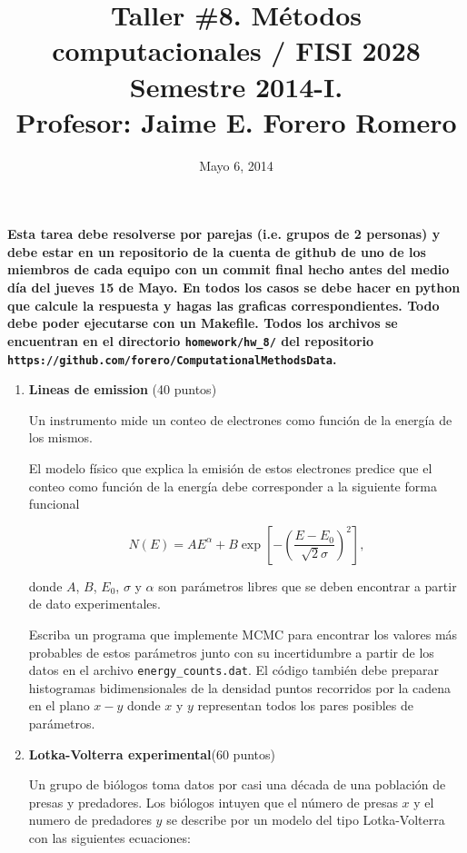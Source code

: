 \documentclass{article}
\title{Taller \#8. M\'etodos computacionales / FISI 2028 \\Semestre
  2014-I. \\ Profesor: Jaime E. Forero Romero}
\date{Mayo 6, 2014}
\begin{document}
\maketitle

{\bf Esta tarea debe resolverse por parejas (i.e. grupos de 2
  personas) y debe estar en un repositorio de la cuenta de github de
  uno de los miembros de cada equipo con un commit final hecho antes del
  medio d\'ia del jueves 15 de Mayo.  En todos los casos se debe hacer
  en python que calcule la respuesta y hagas las graficas
  correspondientes. Todo debe poder ejecutarse con un Makefile. Todos
  los archivos se encuentran en el directorio \verb"homework/hw_8/" del
  repositorio \verb"https://github.com/forero/ComputationalMethodsData".}  


\begin{enumerate}

\item {\bf Lineas de emission} (40 puntos)


Un instrumento mide un conteo de electrones como funci\'on de la
energ\'ia de los mismos.

El modelo f\'isico que explica la emisi\'on de estos electrones
predice que el conteo como funci\'on de la energ\'ia debe corresponder
a la siguiente forma funcional

\begin{equation}
N(E) = AE^{\alpha} + B\exp\left[-\left(\frac{E-E_0}{\sqrt{2}\sigma}\right)^2\right], 
\end{equation}

donde $A$, $B$, $E_0$, $\sigma$ y $\alpha$  son par\'ametros libres
que se deben encontrar a partir de dato experimentales.

Escriba un programa que implemente MCMC para encontrar los valores
m\'as probables de estos par\'ametros junto con su incertidumbre a
partir de los datos en el archivo \verb"energy_counts.dat". El
c\'odigo tambi\'en debe preparar histogramas bidimensionales de la
densidad puntos recorridos por la cadena en el plano $x-y$ donde $x$ y $y$
representan todos los pares posibles de par\'ametros. 


\item{\bf Lotka-Volterra experimental}(60 puntos)

Un grupo de bi\'ologos toma datos por casi una d\'ecada de una
poblaci\'on de presas y predadores. Los bi\'ologos intuyen que el
n\'umero de presas $x$ y el numero de predadores $y$ se describe por
un modelo del tipo Lotka-Volterra con las siguientes ecuaciones:


\end{enumerate}
\end{document}
